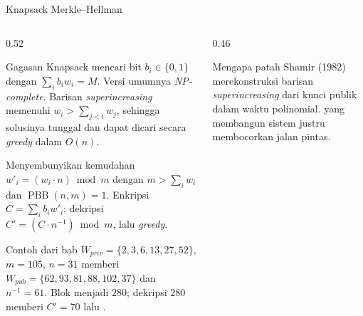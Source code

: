\documentclass[aspectratio=169,11pt]{beamer}
\begin{document}
\begin{frame}{Knapsack Merkle--Hellman}
    \scriptsize
    \vspace{-0.1cm}
    \begin{columns}[T,onlytextwidth]
        \begin{column}{0.52\textwidth}
            \begin{block}{Gagasan}
                Knapsack mencari bit $b_i\in\{0,1\}$ dengan
                $\sum_i b_i w_i=M$. Versi umumnya \textit{NP-complete}.
                Barisan \textit{superincreasing} memenuhi
                $w_i>\sum_{j<i}w_j$, sehingga solusinya tunggal dan dapat
                dicari secara \textit{greedy} dalam $O(n)$.
            \end{block}
            \begin{block}{Menyembunyikan kemudahan}
                $w'_i=(w_i\cdot n)\bmod m$ dengan $m>\sum_i w_i$ dan
                $\operatorname{PBB}(n,m)=1$. Enkripsi
                $C=\sum_i b_i w'_i$; dekripsi
                $C'=(C\cdot n^{-1})\bmod m$, lalu \textit{greedy}.
            \end{block}
            \begin{exampleblock}{Contoh dari bab}
                $W_{priv}=\{2,3,6,13,27,52\}$, $m=105$, $n=31$ memberi
                $W_{pub}=\{62,93,81,88,102,37\}$ dan $n^{-1}=61$.
                Blok  menjadi $280$; dekripsi $280$ memberi
                $C'=70$ lalu .
            \end{exampleblock}
        \end{column}
        \begin{column}{0.46\textwidth}
            \centering
            \vspace{0.08cm}
            \begin{alertblock}{Mengapa patah}
                \footnotesize
                Shamir (1982) merekonstruksi barisan \textit{superincreasing}
                dari kunci publik dalam waktu polinomial.  yang membangun sistem justru membocorkan jalan pintas.
            \end{alertblock}
        \end{column}
    \end{columns}
\end{frame}
\end{document}
